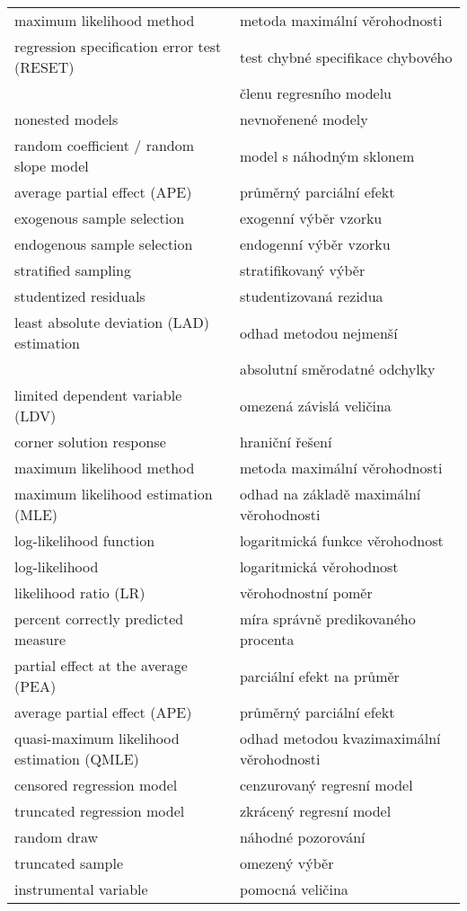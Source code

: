 \begin{table}
\begin{center}
\begin{tabular}{l l}
maximum likelihood method & metoda maximální věrohodnosti\\
regression specification error test (RESET) & test chybné specifikace chybového\\
 & členu regresního modelu\\
nonested models & nevnořenené modely\\
random coefficient / random slope model & model s náhodným sklonem\\
average partial effect (APE) & průměrný parciální efekt\\
exogenous sample selection & exogenní výběr vzorku\\
endogenous sample selection & endogenní výběr vzorku\\
stratified sampling & stratifikovaný výběr\\
studentized residuals & studentizovaná rezidua\\
least absolute deviation (LAD) estimation & odhad metodou nejmenší\\
 & absolutní směrodatné odchylky\\ 
limited dependent variable (LDV) & omezená závislá veličina\\
corner solution response & hraniční řešení\\
maximum likelihood method & metoda maximální věrohodnosti\\
maximum likelihood estimation (MLE) & odhad na základě maximální věrohodnosti\\
log-likelihood function & logaritmická funkce věrohodnost\\
log-likelihood & logaritmická věrohodnost\\
likelihood ratio (LR) & věrohodnostní poměr\\
percent correctly predicted measure & míra správně predikovaného procenta\\
partial effect at the average (PEA) & parciální efekt na průměr\\
average partial effect (APE) & průměrný parciální efekt\\
quasi-maximum likelihood estimation (QMLE) & odhad metodou kvazimaximální věrohodnosti\\
censored regression model & cenzurovaný regresní model\\
truncated regression model & zkrácený regresní model\\
random draw & náhodné pozorování\\
truncated sample & omezený výběr\\
instrumental variable & pomocná veličina\\

\end{tabular}
\end{center}
\end{table}
